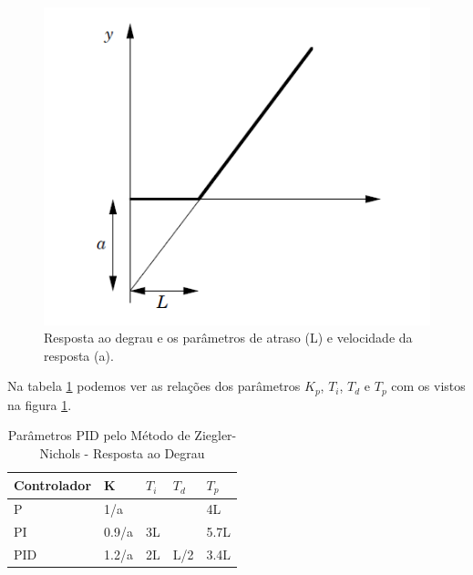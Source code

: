 \begin{figure}[!ht]
  \caption{Resposta ao degrau e os parâmetros de atraso (L) e velocidade da resposta (a).}
  \begin{center}
      \includegraphics[scale=0.75]{img/ziegler-nichols_astrom_p135}
  \end{center}
  \label{fig:ziegler-nichols_astrom_p135}
\end{figure}

Na tabela \ref{tab:Ziegler-Nichols} podemos ver as relações dos parâmetros $K_p$, $T_i$, $T_d$ e $T_p$ com os vistos na figura \ref{fig:ziegler-nichols_astrom_p135}.  

\begin{table}
  \caption{Parâmetros PID pelo Método de Ziegler-Nichols - Resposta ao Degrau}
  \label{tab:Ziegler-Nichols}
  \centering%
  \begin{minipage}{.42\textwidth}
    \begin{tabular*}{\textwidth}{lllll}
      \hline
      {Controlador} & {K} & {$T_i$} & {$T_d$}& {$T_p$}\\ \hline
      \hline
      P    &  1/a   &     &      & 4L  \\ 
      PI   &  0.9/a & 3L  &      & 5.7L  \\
      PID  &  1.2/a & 2L  & L/2  & 3.4L  \\ \hline
    \end{tabular*}
  \end{minipage}
\end{table}

